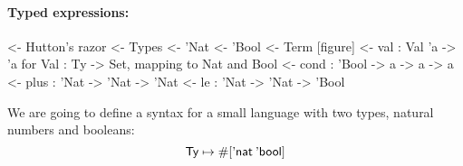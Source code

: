 \paragraph{Typed expressions:}

\begin{wstructure}
<- Hutton's razor
    <- Types
        <- 'Nat
        <- 'Bool
    <- Term [figure]
        <- val : Val 'a -> 'a  for Val : Ty -> Set, mapping to Nat and Bool
        <- cond : 'Bool -> a -> a -> a
        <- plus : 'Nat -> 'Nat -> 'Nat
        <- le : 'Nat -> 'Nat -> 'Bool
\end{wstructure}

\newcommand{\Ty}{\D{Ty}}
\newcommand{\Ebool}{\etag{\CN{bool}}}
\newcommand{\Enat}{\etag{\CN{nat}}}

\newcommand{\SYMBEval}{\etag{\CN{val}}\xspace}
\newcommand{\SYMBEvar}{\etag{\CN{var}}\xspace}
\newcommand{\Eval}[1]{\SYMBEval\:#1}
\newcommand{\SYMBEcond}{\etag{\CN{cond}}\xspace}
\newcommand{\Econd}[3]{\SYMBEcond\:#1\:#2\:#3}
\newcommand{\SYMBEplus}{\etag{\CN{plus}}\xspace}
\newcommand{\Eplus}[2]{\SYMBEplus\:#1\:#2}
\newcommand{\SYMBEle}{\etag{\CN{le}}\xspace}
\newcommand{\Ele}[2]{\SYMBEle\:#1\:#2}

\newcommand{\SYMBVal}{\F{Val}\xspace}
\newcommand{\Val}[1]{\SYMBVal\:#1}
\newcommand{\SYMBVar}{\F{Var}\xspace}
\newcommand{\Var}[2]{\SYMBVar\: #1\: #2}

\newcommand{\HExprD}{\F{ExprD}}
\newcommand{\HExprAD}{\F{ExprAD}}
\newcommand{\HExprID}{\F{ExprID}}
\newcommand{\HExprVarD}[1]{\C{ExprD}_{\F{Var},#1}}
\newcommand{\HExprFreeD}{\C{ExprD}^{\C{Free}}}
\newcommand{\HExprAFreeD}{\C{ExprAD}^{\C{Free}}}

We are going to define a syntax for a small language with
two types, natural numbers and booleans:
%
\[
\Ty \mapsto \EnumT{\sqr{\Enat\: \Ebool}}
\]

\newcommand{\plusHost}{\mathop{\green{+_{\mathrm{H}}}}}
\newcommand{\leHost}{\mathop{\green{\leq_{\mathrm{H}}}}}


